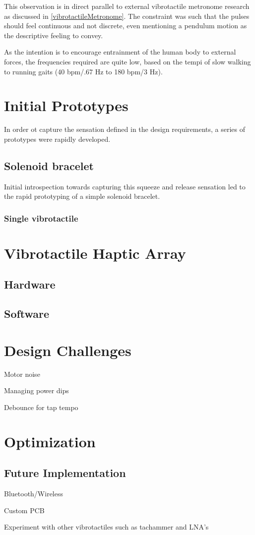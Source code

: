 This observation is in direct parallel to external vibrotactile metronome research as discussed in \ref{vibrotactileMetronome}. The constraint was such that the pulses should feel continuous and not discrete, even mentioning a pendulum motion as the descriptive feeling to convey. 

As the intention is to encourage entrainment of the human body to external forces, the frequencies
required are quite low, based on the tempi of slow walking to running gaits
(40 bpm/.67 Hz to 180 bpm/3 Hz).

\cite{Neely}

\section{Initial Prototypes}
In order ot capture the sensation defined in the design requirements, a series of prototypes were rapidly developed.

\subsection{Solenoid bracelet}
Initial introspection towards capturing this squeeze and release sensation led to the rapid prototyping of a simple solenoid bracelet. 

\subsubsection{Single vibrotactile}

\section{Vibrotactile Haptic Array}

\subsection{Hardware}


\subsection{Software}

\section{Design Challenges}

Motor noise

Managing power dips



Debounce for tap tempo

\section{Optimization}

\subsection{Future Implementation}

Bluetooth/Wireless

Custom PCB

Experiment with other vibrotactiles such as tachammer and LNA's
